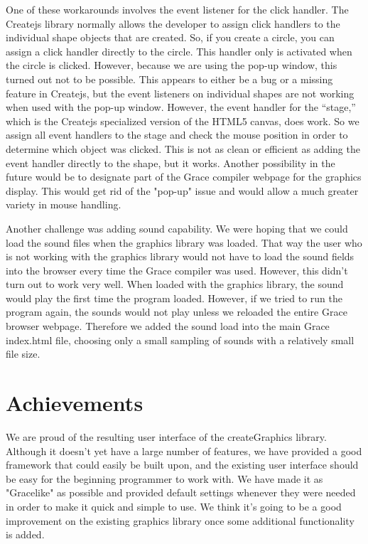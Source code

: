 \documentclass{article}
\begin{document}
One of these workarounds involves the event listener for the click handler. The Createjs library normally allows the
developer to assign click handlers to the individual shape objects that are created. So, if you create a circle, you can
assign a click handler directly to the circle. This handler only is activated when the circle is clicked. However, because
we are using the pop-up window, this turned out not to be possible. This appears to either be a bug or a missing
feature in Createjs, but the event listeners on individual shapes are not working when used with the pop-up window.
However, the event handler for the ``stage,'' which is the Createjs specialized version of the HTML5 canvas, does
work. So we assign all event handlers to the stage and check the mouse position in order to determine which
object was clicked. This is not as clean or efficient as adding the event handler directly to the shape, but it works. 
Another possibility in the future would be to designate part of the Grace compiler webpage for the graphics display.
This would get rid of the "pop-up" issue and would allow a much greater variety in mouse handling.

Another challenge was adding sound capability. We were hoping that we could load the sound files when the
graphics library was loaded. That way the user who is not working with the graphics library would not have to load
the sound fields into the browser every time the Grace compiler was used. However, this didn't turn out to work very
well. When loaded with the graphics library, the sound would play the first time the program loaded. However, if
we tried to run the program again, the sounds would not play unless we reloaded the entire Grace browser webpage.
Therefore we added the sound load into the main Grace index.html file, choosing only a small sampling of sounds with
a relatively small file size.

\section {Achievements}
We are proud of the resulting user interface of the createGraphics library. Although it doesn't yet have a large
number of features, we have provided a good framework that could easily be built upon, and the existing user
interface should be easy for the beginning programmer to work with. We have made it as "Gracelike" as possible
and provided default settings whenever they were needed in order to make it quick and simple to use. We think
it's going to be a good improvement on the existing graphics library once some additional functionality is added.
\end{document}

